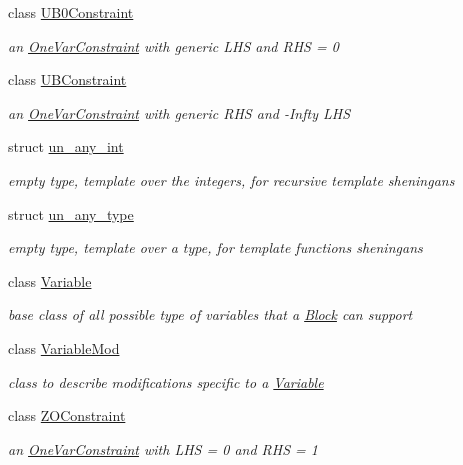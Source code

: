 \begin{DoxyCompactItemize}
class \mbox{\hyperlink{class_s_m_spp__di__unipi__it_1_1_u_b0_constraint}{U\+B0\+Constraint}}
\begin{DoxyCompactList}\small\item\em an \mbox{\hyperlink{class_s_m_spp__di__unipi__it_1_1_one_var_constraint}{One\+Var\+Constraint}} with generic L\+HS and R\+HS = 0 \end{DoxyCompactList}\item 
class \mbox{\hyperlink{class_s_m_spp__di__unipi__it_1_1_u_b_constraint}{U\+B\+Constraint}}
\begin{DoxyCompactList}\small\item\em an \mbox{\hyperlink{class_s_m_spp__di__unipi__it_1_1_one_var_constraint}{One\+Var\+Constraint}} with generic R\+HS and -\/\+Infty L\+HS \end{DoxyCompactList}\item 
struct \mbox{\hyperlink{struct_s_m_spp__di__unipi__it_1_1un__any__int}{un\+\_\+any\+\_\+int}}
\begin{DoxyCompactList}\small\item\em empty type, template over the integers, for recursive template sheningans \end{DoxyCompactList}\item 
struct \mbox{\hyperlink{struct_s_m_spp__di__unipi__it_1_1un__any__type}{un\+\_\+any\+\_\+type}}
\begin{DoxyCompactList}\small\item\em empty type, template over a type, for template functions sheningans \end{DoxyCompactList}\item 
class \mbox{\hyperlink{class_s_m_spp__di__unipi__it_1_1_variable}{Variable}}
\begin{DoxyCompactList}\small\item\em base class of all possible type of variables that a \mbox{\hyperlink{class_s_m_spp__di__unipi__it_1_1_block}{Block}} can support \end{DoxyCompactList}\item 
class \mbox{\hyperlink{class_s_m_spp__di__unipi__it_1_1_variable_mod}{Variable\+Mod}}
\begin{DoxyCompactList}\small\item\em class to describe modifications specific to a \mbox{\hyperlink{class_s_m_spp__di__unipi__it_1_1_variable}{Variable}} \end{DoxyCompactList}\item 
class \mbox{\hyperlink{class_s_m_spp__di__unipi__it_1_1_z_o_constraint}{Z\+O\+Constraint}}
\begin{DoxyCompactList}\small\item\em an \mbox{\hyperlink{class_s_m_spp__di__unipi__it_1_1_one_var_constraint}{One\+Var\+Constraint}} with L\+HS = 0 and R\+HS = 1 \end{DoxyCompactList}\end{DoxyCompactItemize}
